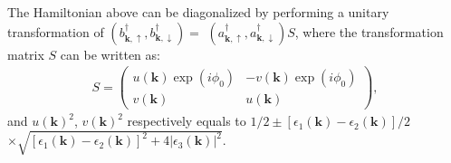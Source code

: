 \documentclass[twocolumn,english,pra,superscriptaddress]{revtex4-1}
\begin{document}
The Hamiltonian above can be diagonalized by performing a unitary transformation of $(b_{\mathbf{k},\uparrow}^{\dagger},b_{\mathbf{k},\downarrow}^{\dagger})=$ $(a_{\mathbf{k},\uparrow}^{\dagger},a_{\mathbf{k},\downarrow}^{\dagger})S$, where the transformation matrix $S$ can be written as:
\begin{align}
S=\begin{pmatrix}
u(\mathbf{k}) \exp(i\phi_{0}) & -v(\mathbf{k})\exp(i\phi_{0})\\
v(\mathbf{k}) & u(\mathbf{k})
\end{pmatrix},
\end{align}
and $u(\mathbf{k})^{2}$, $v(\mathbf{k})^{2}$ respectively equals to $1/2\pm \left[\epsilon_{1}(\mathbf{k})-\epsilon_{2}(\mathbf{k}) \right]/2$ $\times\sqrt{[\epsilon_{1}(\mathbf{k})-\epsilon_{2}(\mathbf{k})]^{2}+4|\epsilon_{3}(\mathbf{k})|^{2}}$.
\par
\end{document}

